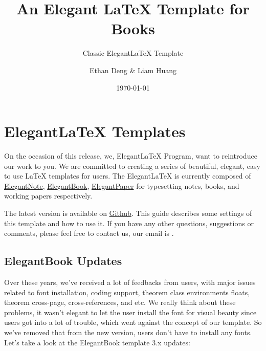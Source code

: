 \documentclass[noanswer,fancy,blue,11pt,hide]{elegantbook}
\title{An Elegant \LaTeX{} Template for Books}
\subtitle{Classic Elegant\LaTeX{} Template}
\author{Ethan Deng \& Liam Huang}
\institute{Elegant\LaTeX{} Program}
\date{\today}
\begin{document}
\maketitle
\tableofcontents
\clearpage
\thispagestyle{empty}
\mainmatter
\hypersetup{pageanchor=true}

\chapter{Elegant\LaTeX{} Templates}

On the occasion of this release, we, Elegant\LaTeX{} Program, want to reintroduce our work to you. We are committed to creating a series of beautiful, elegant, easy to use \LaTeX{} templates for users. The Elegant\LaTeX{} is currently composed of \href{https://github.com/ElegantLaTeX/ElegantNote}{ElegantNote}, \href{https://github.com/ElegantLaTeX/ElegantBook}{ElegantBook}, \href{https://github.com/ElegantLaTeX/ElegantPaper}{ElegantPaper} for typesetting notes, books, and working papers respectively. 

The latest version is available on \href{https://github.com/ElegantLaTeX/ElegantBook/releases}{Github}. This guide describes some settings of this template and how to use it. If you have any other questions, suggestions or comments, please feel free to contact us, our email is .


\section{ElegantBook Updates}
Over these years, we've received a lot of feedbacks from users, with major issues related to font installation, coding support, theorem class environments floats, theorem cross-page, cross-references, and etc. We really think about these problems, it wasn't elegant to let the user install the font for visual beauty since users got into a lot of trouble, which went against the concept of our template. So we've removed that from the new version, users don't have to install any fonts. Let's take a look at the ElegantBook template 3.x updates:
\end{document}
